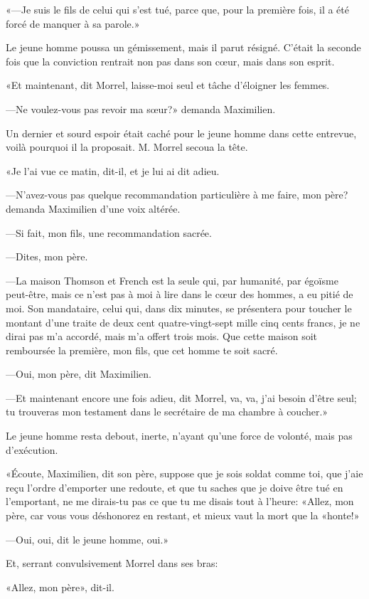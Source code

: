«—Je suis le fils de celui qui s'est tué, parce que, pour la première fois, il a été forcé de manquer à sa parole.»

Le jeune homme poussa un gémissement, mais il parut résigné. C'était la seconde fois que la conviction rentrait non pas dans son cœur, mais dans son esprit.

«Et maintenant, dit Morrel, laisse-moi seul et tâche d'éloigner les femmes.

—Ne voulez-vous pas revoir ma sœur?» demanda Maximilien.

Un dernier et sourd espoir était caché pour le jeune homme dans cette entrevue, voilà pourquoi il la proposait. M. Morrel secoua la tête.

«Je l'ai vue ce matin, dit-il, et je lui ai dit adieu.

—N'avez-vous pas quelque recommandation particulière à me faire, mon père? demanda Maximilien d'une voix altérée.

—Si fait, mon fils, une recommandation sacrée.

—Dites, mon père.

—La maison Thomson et French est la seule qui, par humanité, par égoïsme peut-être, mais ce n'est pas à moi à lire dans le cœur des hommes, a eu pitié de moi. Son mandataire, celui qui, dans dix minutes, se présentera pour toucher le montant d'une traite de deux cent quatre-vingt-sept mille cinq cents francs, je ne dirai pas m'a accordé, mais m'a offert trois mois. Que cette maison soit remboursée la première, mon fils, que cet homme te soit sacré.

—Oui, mon père, dit Maximilien.

—Et maintenant encore une fois adieu, dit Morrel, va, va, j'ai besoin d'être seul; tu trouveras mon testament dans le secrétaire de ma chambre à coucher.»

Le jeune homme resta debout, inerte, n'ayant qu'une force de volonté, mais pas d'exécution.

«Écoute, Maximilien, dit son père, suppose que je sois soldat comme toi, que j'aie reçu l'ordre d'emporter une redoute, et que tu saches que je doive être tué en l'emportant, ne me dirais-tu pas ce que tu me disais tout à l'heure: «Allez, mon père, car vous vous déshonorez en restant, et mieux vaut la mort que la «honte!»

—Oui, oui, dit le jeune homme, oui.»

Et, serrant convulsivement Morrel dans ses bras:

«Allez, mon père», dit-il.

